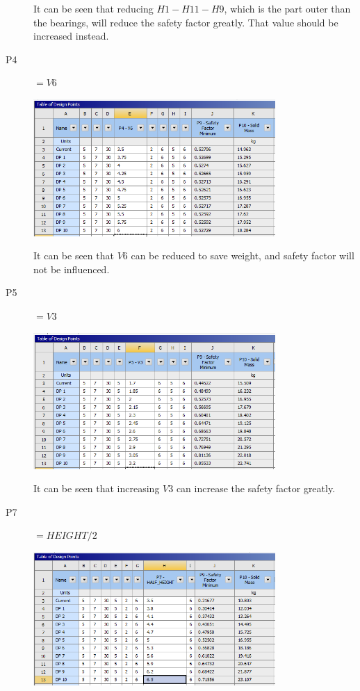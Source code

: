 \documentclass[a4paper,14pt]{extarticle}
\begin{document}
\begin{description}
It can be seen that reducing $H1 - H11 - H9$, which is the part outer than the bearings, will reduce the safety factor greatly. That value should be increased instead.
\item[P4] $=V6$

\includegraphics[width=0.75\textwidth]{singleParam/P4.PNG}

It can be seen that $V6$ can be reduced to save weight, and safety factor will not be influenced.
\item[P5] $=V3$

\includegraphics[width=0.75\textwidth]{singleParam/P5.PNG}

It can be seen that increasing $V3$ can increase the safety factor greatly.
\item[P7] $=HEIGHT / 2$

\includegraphics[width=0.75\textwidth]{singleParam/P7.PNG}


\end{description}
\end{document}
